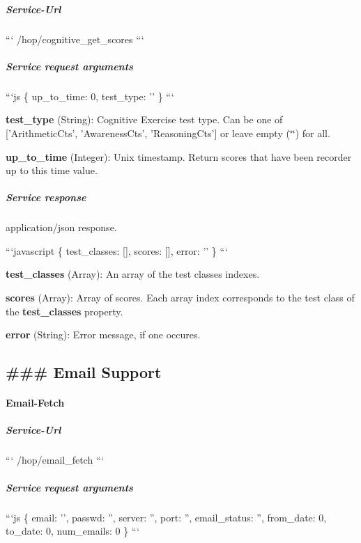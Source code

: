 \subparagraph*{Service-\/\-Url}

``` /hop/cognitive\-\_\-get\-\_\-scores ```

\subparagraph*{Service request arguments}

```js \{ up\-\_\-to\-\_\-time\-: 0, test\-\_\-type\-: '' \} ```


\begin{DoxyItemize}
\item {\bfseries test\-\_\-type} (String)\-: Cognitive Exercise test type. Can be one of \mbox{[}'Arithmetic\-Cts', 'Awareness\-Cts', 'Reasoning\-Cts'\mbox{]} or leave empty (\char`\"{}\char`\"{}) for all.
\item {\bfseries up\-\_\-to\-\_\-time} (Integer)\-: Unix timestamp. Return scores that have been recorder up to this time value.
\end{DoxyItemize}

\subparagraph*{Service response}

application/json response.

```javascript \{ test\-\_\-classes\-: \mbox{[}\mbox{]}, scores\-: \mbox{[}\mbox{]}, error\-: '' \} ```


\begin{DoxyItemize}
\item {\bfseries test\-\_\-classes} (Array)\-: An array of the test classes indexes.
\item {\bfseries scores} (Array)\-: Array of scores. Each array index corresponds to the test class of the {\bfseries test\-\_\-classes} property.
\item {\bfseries error} (String)\-: Error message, if one occures.
\end{DoxyItemize}



 \subsection*{\#\#\# Email Support }

\paragraph*{Email-\/\-Fetch}

\subparagraph*{Service-\/\-Url}

``` /hop/email\-\_\-fetch ```

\subparagraph*{Service request arguments}

```js \{ email\-: '', passwd\-: '', server\-: '', port\-: '', email\-\_\-status\-: '', from\-\_\-date\-: 0, to\-\_\-date\-: 0, num\-\_\-emails\-: 0 \} ```


